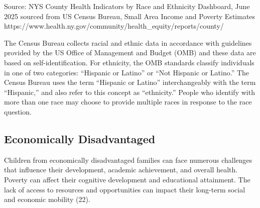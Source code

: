 \documentclass[
  english,
  letterpaper,
]{report}
\begin{document}
\begin{tcolorbox}[enhanced jigsaw, breakable, leftrule=.75mm, title=\textcolor{quarto-callout-note-color}{\faInfo}\hspace{0.5em}{Source}, bottomrule=.15mm, opacityback=0, left=2mm, colback=white, bottomtitle=1mm, coltitle=black, colbacktitle=quarto-callout-note-color!10!white, colframe=quarto-callout-note-color-frame, opacitybacktitle=0.6, toptitle=1mm, titlerule=0mm, arc=.35mm, rightrule=.15mm, toprule=.15mm]

Source: NYS County Health Indicators by Race and Ethnicity Dashboard,
June 2025 sourced from US Census Bureau, Small Area Income and Poverty
Estimates
https://www.health.ny.gov/community/health\_equity/reports/county/

\end{tcolorbox}

\begin{tcolorbox}[enhanced jigsaw, breakable, leftrule=.75mm, title=\textcolor{quarto-callout-note-color}{\faInfo}\hspace{0.5em}{Note}, bottomrule=.15mm, opacityback=0, left=2mm, colback=white, bottomtitle=1mm, coltitle=black, colbacktitle=quarto-callout-note-color!10!white, colframe=quarto-callout-note-color-frame, opacitybacktitle=0.6, toptitle=1mm, titlerule=0mm, arc=.35mm, rightrule=.15mm, toprule=.15mm]

The Census Bureau collects racial and ethnic data in accordance with
guidelines provided by the US Office of Management and Budget (OMB) and
these data are based on self-identification. For ethnicity, the OMB
standards classify individuals in one of two categories: ``Hispanic or
Latino'' or ``Not Hispanic or Latino.'' The Census Bureau uses the term
``Hispanic or Latino'' interchangeably with the term ``Hispanic,'' and
also refer to this concept as ``ethnicity.'' People who identify with
more than one race may choose to provide multiple races in response to
the race question.

\end{tcolorbox}

\subsection{Economically
Disadvantaged}\label{economically-disadvantaged}

Children from economically disadvantaged families can face numerous
challenges that influence their development, academic achievement, and
overall health. Poverty can affect their cognitive development and
educational attainment. The lack of access to resources and
opportunities can impact their long-term social and economic mobility
(22).
\end{document}
